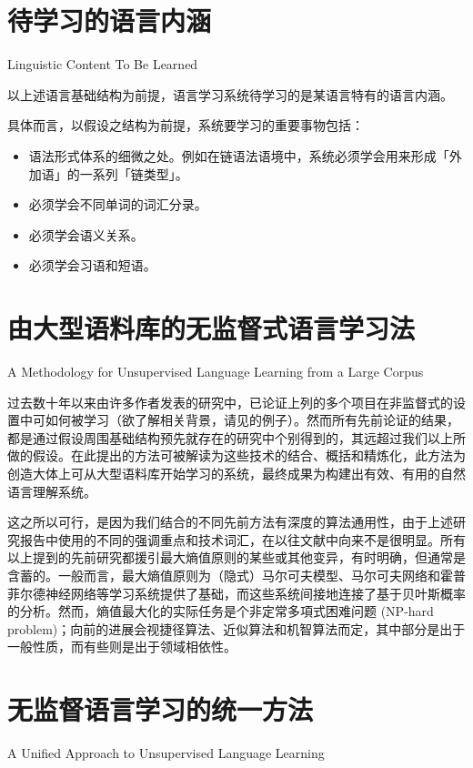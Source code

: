 \section{待学习的语言内涵}{Linguistic Content To Be Learned}

以上述语言基础结构为前提，语言学习系统待学习的是某语言特有的语言内涵。 

具体而言，以假设之结构为前提，系统要学习的重要事物包括：

\begin{itemize}
\item 语法形式体系的细微之处。例如在链语法语境中，系统必须学会用来形成「外加语」的一系列「链类型」。 
\item 必须学会不同单词的词汇分录。 
\item 必须学会语义关系。 
\item 必须学会习语和短语。
\end{itemize}

\section{由大型语料库的无监督式语言学习法}{A Methodology for Unsupervised Language Learning from a Large Corpus}

过去数十年以来由许多作者发表的研究中，已论证上列的多个项目在非监督式的设置中可如何被学习（欲了解相关背景，请见\cite{Yuret1998,Klein2004,Lin2001,Cohen2010,Poon2009,Mihalcea2007,Kart2013}的例子）。然而所有先前论证的结果，都是通过假设周围基础结构预先就存在的研究中个别得到的，其远超过我们以上所做的假设。在此提出的方法可被解读为这些技术的结合、概括和精炼化，此方法为创造大体上可从大型语料库开始学习的系统，最终成果为构建出有效、有用的自然语言理解系统。

这之所以可行，是因为我们结合的不同先前方法有深度的算法通用性，由于上述研究报告中使用的不同的强调重点和技术词汇，在以往文献中向来不是很明显。所有以上提到的先前研究都援引最大熵值原则的某些或其他变异，有时明确，但通常是含蓄的。一般而言，最大熵值原则为（隐式）马尔可夫模型、马尔可夫网络和霍普菲尔德神经网络等学习系统提供了基础，而这些系统间接地连接了基于贝叶斯概率的分析。然而，熵值最大化的实际任务是个非定常多項式困难问题 (NP-hard problem)；向前的进展会视捷径算法、近似算法和机智算法而定，其中部分是出于一般性质，而有些则是出于领域相依性。

\section{无监督语言学习的统一方法}{A Unified Approach to Unsupervised Language Learning}

